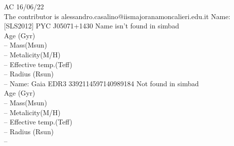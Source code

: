 AC 16/06/22\\ The contributor is alessandro.casalino@iismajoranamoncalieri.edu.it
Name:  [SLS2012] PYC J05071+1430 Name isn't found in simbad \\
Age (Gyr)\\
--
Mass(Msun)\\
--
Metalicity(M/H)\\
--
Effective temp.(Teff)\\
--
Radius (Rsun)\\
--
Name:  Gaia EDR3 3392114597140989184 Not found in simbad \\
Age (Gyr)\\
--
Mass(Msun)\\
--
Metalicity(M/H)\\
--
Effective temp.(Teff)\\
--
Radius (Rsun)\\
--